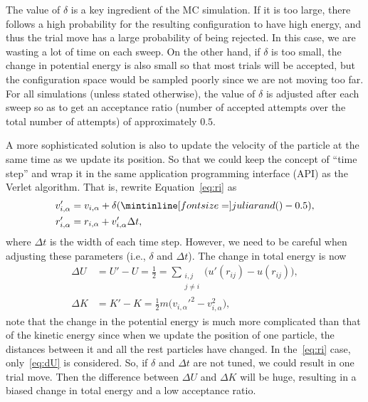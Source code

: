 The value of \(\delta\) is a key
ingredient of the MC simulation. If it is too large, there follows a high probability
for the resulting configuration to have high energy, and thus the trial move has a
large probability of being rejected.
In this case, we are wasting a lot of time on each sweep.
On the other hand, if \(\delta\) is too small, the change in
potential energy is also small so that most trials will be accepted, but the configuration
space would be sampled poorly since we are not moving too far.
For all simulations (unless stated otherwise), the
value of \(\delta\) is adjusted after each sweep so as to get an acceptance ratio (number of
accepted attempts over the total number of attempts) of approximately \(0.5\).

A more sophisticated solution is also to update the velocity of the particle
at the same time as we update its position. So that we could keep the concept of
``time step'' and wrap it in the same application programming interface (API)
as the Verlet algorithm.
That is, rewrite Equation~\eqref{eq:ri} as
%
\begin{align}
    v_{i, \alpha}' & = v_{i, \alpha} + \delta (\code{rand()} - 0.5),\label{eq:vnew} \\
    r_{i, \alpha}' & = r_{i, \alpha} + v_{i, \alpha}' \Delta t,\label{eq:rnew}
\end{align}
%
where \(\Delta t\) is the width of each time step.
However, we need to be careful when adjusting these parameters (i.e., \(\delta\) and
\(\Delta t\)). The change in total energy is now
%
\begin{align}
    \Delta U & = U' - U = \frac{1}{2} = \sum_{\substack{i, j \\ j \neq i}} \bigl(u'(r_{ij}) - u(r_{ij})\bigr),\label{eq:dU} \\
    \Delta K & = K' - K = \frac{1}{2} m \bigl(v_{i, \alpha}'^2 - v_{i, \alpha}^2\bigr),
\end{align}
%
note that the change in the potential energy is much more complicated than that of the
kinetic energy since when we update the position of one particle, the distances
between it and all the rest particles have changed.
In the~\eqref{eq:ri} case, only~\eqref{eq:dU} is considered.
So, if \(\delta\) and \(\Delta t\) are not tuned, we could result in one trial move.
Then the difference between \(\Delta U\) and \(\Delta K\) will be huge, resulting in a
biased change in total energy and a low acceptance ratio.

